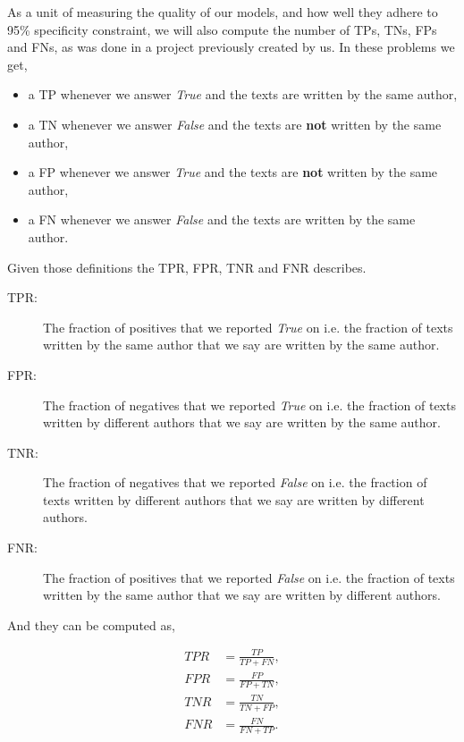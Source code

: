 As a unit of measuring the quality of our models, and how well they adhere to
95\% specificity constraint, we will also compute the number of \gls{TP}s,
\gls{TN}s, \gls{FP}s and \gls{FN}s, as was done in a project previously created
by us.\cite{US} In these problems we get,

\begin{itemize}
    \item a \gls{TP} whenever we answer \textit{True} and the texts are written
        by the same author,
    \item a \gls{TN} whenever we answer \textit{False} and the texts are
        \textbf{not} written by the same author,
    \item a \gls{FP} whenever we answer \textit{True} and the texts are
        \textbf{not} written by the same author,
    \item a \gls{FN} whenever we answer \textit{False} and the texts are written
        by the same author.
\end{itemize}

Given those definitions the \gls{TPR}, \gls{FPR}, \gls{TNR} and \gls{FNR}
describes.

\begin{description}
    \item[\gls{TPR}: ] The fraction of positives that we reported \textit{True}
        on i.e. the fraction of texts written by the same author that we say are
        written by the same author.
    \item[\gls{FPR}: ] The fraction of negatives that we reported \textit{True}
        on i.e. the fraction of texts written by different authors that we say
        are written by the same author.
    \item[\gls{TNR}: ] The fraction of negatives that we reported \textit{False}
        on i.e. the fraction of texts written by different authors that we say
        are written by different authors.
    \item[\gls{FNR}: ] The fraction of positives that we reported \textit{False}
        on i.e. the fraction of texts written by the same author that we say are
        written by different authors.
\end{description}

And they can be computed as,

\begin{align}
    TPR &= \frac{TP}{TP + FN}, \\
    FPR &= \frac{FP}{FP + TN}, \\
    TNR &= \frac{TN}{TN + FP}, \\
    FNR &= \frac{FN}{FN + TP}.
\end{align}

